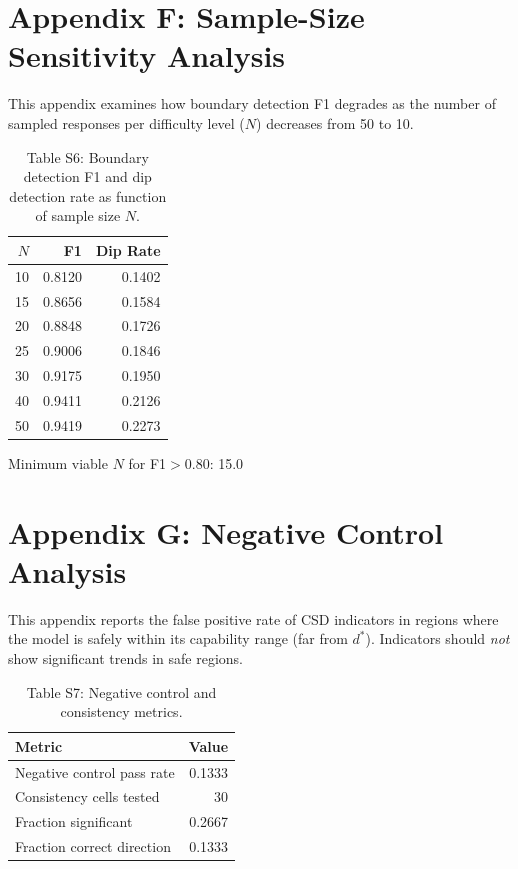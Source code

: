 \documentclass[11pt]{article}
\begin{document}
\clearpage


\section{Appendix F: Sample-Size Sensitivity Analysis}
\label{app:sensitivity}

This appendix examines how boundary detection F1 degrades as the number
of sampled responses per difficulty level ($N$) decreases from 50 to 10.

\begin{table}[h]\centering\small
\caption{Table S6: Boundary detection F1 and dip detection rate as function of sample size $N$.}
\label{tab:sensitivity}
\begin{tabular}{r|r|r}
\toprule
$N$ & F1 & Dip Rate \\
\midrule
10 & 0.8120 & 0.1402 \\
15 & 0.8656 & 0.1584 \\
20 & 0.8848 & 0.1726 \\
25 & 0.9006 & 0.1846 \\
30 & 0.9175 & 0.1950 \\
40 & 0.9411 & 0.2126 \\
50 & 0.9419 & 0.2273 \\
\bottomrule
\end{tabular}
\end{table}

Minimum viable $N$ for F1$>$0.80: 15.0


\clearpage


\section{Appendix G: Negative Control Analysis}
\label{app:negative}

This appendix reports the false positive rate of CSD indicators in regions
where the model is safely within its capability range (far from $d^*$).
Indicators should \emph{not} show significant trends in safe regions.

\begin{table}[h]\centering\small
\caption{Table S7: Negative control and consistency metrics.}
\label{tab:negative}
\begin{tabular}{l|r}
\toprule
Metric & Value \\
\midrule
Negative control pass rate & 0.1333 \\
Consistency cells tested & 30 \\
Fraction significant & 0.2667 \\
Fraction correct direction & 0.1333 \\
\bottomrule
\end{tabular}
\end{table}
\end{document}
